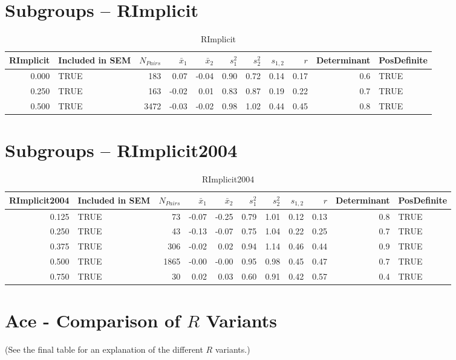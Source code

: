 \documentclass{article}\usepackage[]{graphicx}\usepackage[]{color}
\begin{document}
\section{Subgroups --  RImplicit }%
\begin{table}[ht]
\centering
\begin{tabular}{rlrrrrrrrrl}
  \hline
RImplicit & Included in SEM & $N_{Pairs}$ & $\bar{x}_1$ & $\bar{x}_2$ & $s_1^2$ & $s_2^2$ & $s_{1,2}$ & $r$ & Determinant & PosDefinite \\ 
  \hline
0.000 & TRUE & 183 & 0.07 & -0.04 & 0.90 & 0.72 & 0.14 & 0.17 & 0.6 & TRUE \\ 
  0.250 & TRUE & 163 & -0.02 & 0.01 & 0.83 & 0.87 & 0.19 & 0.22 & 0.7 & TRUE \\ 
  0.500 & TRUE & 3472 & -0.03 & -0.02 & 0.98 & 1.02 & 0.44 & 0.45 & 0.8 & TRUE \\ 
   \hline
\end{tabular}
\caption{RImplicit} 
\end{table}
\section{Subgroups --  RImplicit2004 }%
\begin{table}[ht]
\centering
\begin{tabular}{rlrrrrrrrrl}
  \hline
RImplicit2004 & Included in SEM & $N_{Pairs}$ & $\bar{x}_1$ & $\bar{x}_2$ & $s_1^2$ & $s_2^2$ & $s_{1,2}$ & $r$ & Determinant & PosDefinite \\ 
  \hline
0.125 & TRUE & 73 & -0.07 & -0.25 & 0.79 & 1.01 & 0.12 & 0.13 & 0.8 & TRUE \\ 
  0.250 & TRUE & 43 & -0.13 & -0.07 & 0.75 & 1.04 & 0.22 & 0.25 & 0.7 & TRUE \\ 
  0.375 & TRUE & 306 & -0.02 & 0.02 & 0.94 & 1.14 & 0.46 & 0.44 & 0.9 & TRUE \\ 
  0.500 & TRUE & 1865 & -0.00 & -0.00 & 0.95 & 0.98 & 0.45 & 0.47 & 0.7 & TRUE \\ 
  0.750 & TRUE & 30 & 0.02 & 0.03 & 0.60 & 0.91 & 0.42 & 0.57 & 0.4 & TRUE \\ 
   \hline
\end{tabular}
\caption{RImplicit2004} 
\end{table}


\section{Ace - Comparison of $R$ Variants} 
(See the final table for an explanation of the different $R$ variants.)
\end{document}

